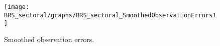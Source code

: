  
\begin{figure}[H]
\centering 
\texttt{[image: BRS\_sectoral/graphs/BRS\_sectoral\_SmoothedObservationErrors1]}
\caption{Smoothed observation errors.}\label{Fig:SmoothedObservationErrors:1}
\end{figure}


